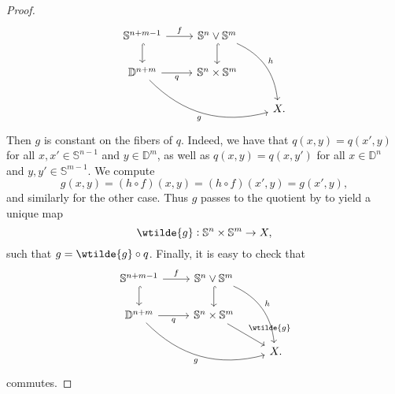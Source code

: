 \begin{proof}
\begin{equation*}
		\begin{tikzcd}
			\mathbb{S}^{n + m - 1} \arrow[r,"f"]\arrow[d,hook] & \mathbb{S}^n \vee \mathbb{S}^m \arrow[d,hook]\arrow[ddr,bend left,"h"]\\
			\mathbb{D}^{n + m} \arrow[r,"q"']\arrow[drr,bend right,"g"'] & \mathbb{S}^n \times \mathbb{S}^m\\
			& & X.
		\end{tikzcd}
	\end{equation*}
	Then $g$ is constant on the fibers of $q$. Indeed, we have that $q(x,y) = q(x',y)$ for all $x,x' \in \mathbb{S}^{n - 1}$ and $y \in \mathbb{D}^m$, as well as $q(x,y) = q(x,y')$ for all $x \in \mathbb{D}^n$ and $y,y' \in \mathbb{S}^{m - 1}$. We compute 
	\begin{equation*}
		g(x,y) = (h \circ f)(x,y) = (h \circ f)(x',y) = g(x',y),
	\end{equation*}
	\noindent and similarly for the other case. Thus $g$ passes to the quotient by \cite[72]{lee:topological_manifolds:2011} to yield a unique map
	\begin{equation*}
		\wtilde{g} : \mathbb{S}^n \times \mathbb{S}^m \to X,
	\end{equation*}
	\noindent such that $g = \wtilde{g} \circ q$. Finally, it is easy to check that
	\begin{equation*}
		\begin{tikzcd}
			\mathbb{S}^{n + m - 1} \arrow[r,"f"]\arrow[d,hook] & \mathbb{S}^n \vee \mathbb{S}^m \arrow[d,hook]\arrow[ddr,bend left,"h"]\\
			\mathbb{D}^{n + m} \arrow[r,"q"']\arrow[drr,bend right,"g"'] & \mathbb{S}^n \times \mathbb{S}^m\arrow[dr,"\wtilde{g}"]\\
			& & X.
		\end{tikzcd}
	\end{equation*}
	\noindent commutes.
\end{proof}

